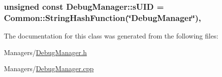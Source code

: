 \subsubsection[{\texorpdfstring{s\+U\+ID}{sUID}}]{\setlength{\rightskip}{0pt plus 5cm}unsigned const Debug\+Manager\+::s\+U\+ID = {\bf Common\+::\+String\+Hash\+Function}(\char`\"{}Debug\+Manager\char`\"{})\hspace{0.3cm}{\ttfamily [static]}, {\ttfamily [private]}}\hypertarget{classDebugManager_a8eb62360ecdb95fbd935c214f264ffa2}{}\label{classDebugManager_a8eb62360ecdb95fbd935c214f264ffa2}


The documentation for this class was generated from the following files\+:\begin{DoxyCompactItemize}
\item 
Managers/\hyperlink{DebugManager_8h}{Debug\+Manager.\+h}\item 
Managers/\hyperlink{DebugManager_8cpp}{Debug\+Manager.\+cpp}\end{DoxyCompactItemize}
